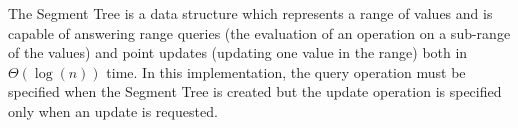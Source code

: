 The Segment Tree is a data structure which represents a range of values and is capable of answering range queries (the evaluation of an operation on a sub-range of the values) and point updates (updating one value in the range) both in $\Theta(\log(n))$ time. In this implementation, the query operation must be specified when the Segment Tree is created but the update operation is specified only when an update is requested.